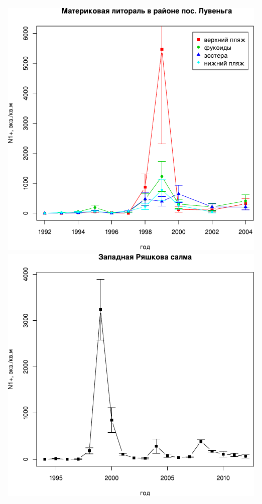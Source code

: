 \begin{figure}[p]
	\begin{minipage}[b]{.46\linewidth}
	\begin{center}
		\includegraphics[width=65mm]{../White_Sea/Luvenga_II_razrez/2razrez_N_oneyear1.pdf}
	\end{center}
	\end{minipage}
%
	\hfil %
%
	\begin{minipage}[b]{.46\linewidth}
	\begin{center}
		\includegraphics[width=65mm]{../White_Sea/Ryashkov_ZRS/ZRS_N_oneyear1.pdf}
	\end{center}
	\end{minipage}



\end{figure}
